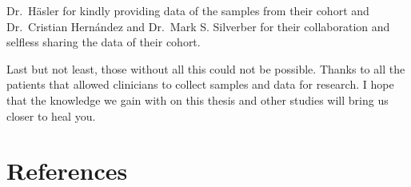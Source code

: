 \documentclass[
  12pt,
  a4paper,
  twoside,
  openright]{book}
\begin{document}
Dr.~Häsler for kindly providing data of the samples from their cohort and Dr.~Cristian Hernández and Dr.~Mark S. Silverber for their collaboration and selfless sharing the data of their cohort.

Last but not least, those without all this could not be possible.
Thanks to all the patients that allowed clinicians to collect samples and data for research.
I hope that the knowledge we gain with on this thesis and other studies will bring us closer to heal you.

\hypertarget{references}{%
\chapter*{References}\label{references}}

\hypertarget{refs}{}
\end{document}
